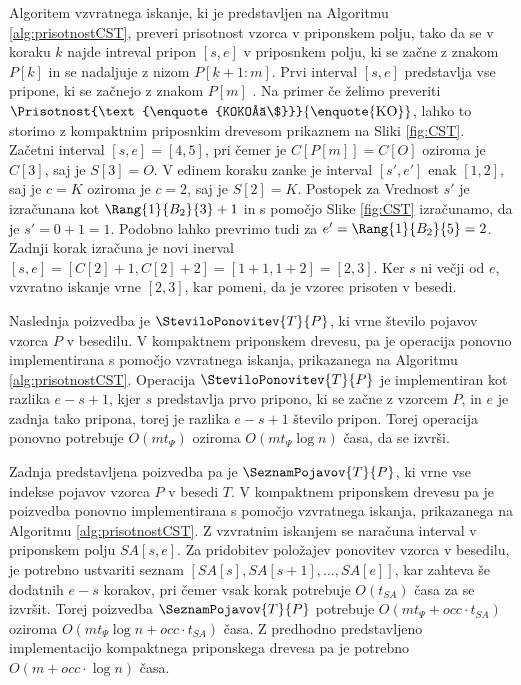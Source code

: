 Algoritem vzvratnega iskanje, ki je predstavljen na Algoritmu \ref{alg:prisotnostCST}, preveri prisotnost vzorca v priponskem polju, tako da se v koraku $k$ najde intreval pripon $[s,e]$ v priposnkem polju, ki se začne z znakom $P[k]$ in se nadaljuje z nizom $P[k+1:m]$. Prvi interval $[s,e]$ predstavlja vse pripone, ki se začnejo z znakom $P[m]$ \cite{Navarro2016}. Na primer če želimo preveriti $\Prisotnost{\text{\enquote{KOKOŠ\$}}}{\text{\enquote{KO}}}$, lahko to storimo z kompaktnim priposnkim drevesom prikaznem na Sliki \ref{fig:CST}. Začetni interval $[s,e]=[4,5]$, pri čemer je $C[P[m]]=C[O]$ oziroma je $C[3]$, saj je $S[3]=O$. V edinem koraku zanke je interval $[s',e']$ enak $[1,2]$, saj je $c=K$ oziroma je $c=2$, saj je $S[2]=K$. Postopek za Vrednost $s'$ je izračunana kot $\Rang{1}{B_2}{3}+1$ in s pomočjo Slike \ref{fig:CST} izračunamo, da je $s'=0+1=1$. Podobno lahko prevrimo tudi za $e'=\Rang{1}{B_2}{5}=2$. Zadnji korak izračuna je novi inerval $[s,e]=[C[2]+1,C[2]+2]=[1+1,1+2]=[2,3]$. Ker $s$ ni večji od $e$, vzvratno iskanje vrne $[2,3]$, kar pomeni, da je vzorec prisoten v besedi.

Naslednja poizvedba je $\SteviloPonovitev{T}{P}$, ki vrne število pojavov vzorca $P$ v besedilu. V kompaktnem priponskem drevesu, pa je operacija ponovno implementirana s pomočjo vzvratnega iskanja, prikazanega na Algoritmu \ref{alg:prisotnostCST}. Operacija $\SteviloPonovitev{T}{P}$ je implementiran kot razlika $e-s+1$, kjer $s$ predstavlja prvo pripono, ki se začne z vzorcem $P$, in $e$ je zadnja tako pripona, torej je razlika $e-s+1$ število pripon. Torej operacija ponovno potrebuje $O(mt_\Psi)$ oziroma $O(mt_\Psi\log{n})$ časa, da se izvrši.

Zadnja predstavljena poizvedba pa je $\SeznamPojavov{T}{P}$, ki vrne vse indekse pojavov vzorca $P$ v besedi $T$. V kompaktnem priponskem drevesu pa je poizvedba ponovno implementirana s pomočjo vzvratnega iskanja, prikazanega na Algoritmu \ref{alg:prisotnostCST}. Z vzvratnim iskanjem se naračuna interval v priponskem polju $SA[s,e]$. Za pridobitev položajev ponovitev vzorca v besedilu, je potrebno ustvariti seznam $[SA[s],SA[s+1],\dots,SA[e]]$, kar zahteva še dodatnih $e-s$ korakov, pri čemer vsak korak potrebuje $O(t_{SA})$ časa za se izvršit. Torej poizvedba $\SeznamPojavov{T}{P}$ potrebuje $O(mt_\Psi+occ\cdot t_{SA})$ oziroma $O(mt_\Psi \log{n}+occ\cdot t_{SA})$ časa. Z predhodno predstavljeno implementacijo kompaktnega priponskega drevesa pa je potrebno $O(m+occ\cdot\log{n})$ časa.

